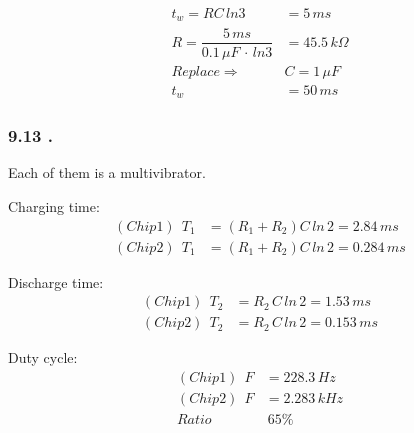     {\color{hwSolution}
        \begin{align*}
            t_w = RC\,ln3 &= 5\,ms\\
            R = \dfrac{5\,ms}{0.1\,\mu F\,\cdot\,ln3} &= 45.5\,k\Omega \\
            Replace \Rightarrow& C=1\,\mu F\\
            t_w &= 50\,ms
        \end{align*}
    }

    \subsubsection{9.13 \textnormal{}.}
    {\color{hwSolution}

        Each of them is a multivibrator.
    }

    {\color{hwSolution}

        Charging time:
        \begin{align*}
            (Chip1)~~T_{1} &= (R_1+R_2)C\,ln\,2 = 2.84\,ms\\
            (Chip2)~~T_{1} &= (R_1+R_2)C\,ln\,2 = 0.284\,ms
        \end{align*}

        Discharge time:
        \begin{align*}
            (Chip1)~~T_{2} &= R_2\,C\,ln\,2 = 1.53\,ms\\
            (Chip2)~~T_{2} &= R_2\,C\,ln\,2 = 0.153\,ms
        \end{align*}

    Duty cycle:
    \begin{align*}
        (Chip1)~~F &= 228.3\,Hz\\
        (Chip2)~~F &= 2.283\,kHz\\
        Ratio&~65\%
    \end{align*}
        
    }

    {\color{hwSolution}
        
        

    }